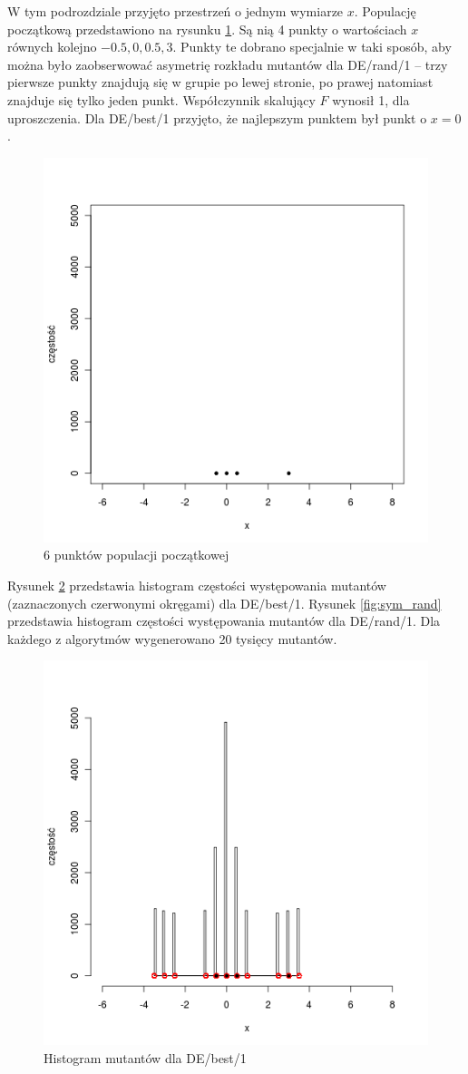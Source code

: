 \documentclass[a4paper,onecolumn,oneside,12pt,wide,floatssmall]{mwrep}
\theoremstyle{definition}
\theoremstyle{plain}%
\theoremstyle{remark}
\begin{document}
W tym podrozdziale przyjęto przestrzeń o jednym wymiarze $x$.
Populację początkową przedstawiono na rysunku \ref{fig:sym_none}.
Są nią 4 punkty o wartościach $x$ równych kolejno $-0.5, 0, 0.5, 3$.
Punkty te dobrano specjalnie w taki sposób, aby można było zaobserwować asymetrię
rozkładu mutantów dla DE/rand/1 -- trzy pierwsze punkty znajdują się w grupie po lewej stronie, 
po prawej natomiast znajduje się tylko jeden punkt.
Współczynnik skalujący $F$ wynosił 1, dla uproszczenia.
Dla DE/best/1 przyjęto, że najlepszym punktem był punkt o $x = 0$.

\begin{figure}[H]
\centering
\includegraphics[width=.65\textwidth]{img/none}
\caption{6 punktów populacji początkowej} 
\label{fig:sym_none}
\end{figure}
Rysunek \ref{fig:sym_best} przedstawia histogram częstości występowania
mutantów (zaznaczonych czerwonymi okręgami) dla DE/best/1. 
Rysunek \ref{fig:sym_rand} przedstawia histogram częstości występowania
mutantów dla DE/rand/1. Dla każdego z algorytmów wygenerowano 20 tysięcy mutantów.

\begin{figure}[H]
\centering
\includegraphics[width=.65\textwidth]{img/best}
\caption{Histogram mutantów dla DE/best/1} 
\label{fig:sym_best}
\end{figure}
\end{document}
